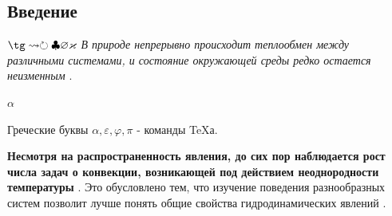 \documentclass[14pt,a4paper,oneside]{extarticle}	%
\begin{document}
\newpage 	%

\setcounter{page}{3}%
\renewcommand{\contentsname}{\center{Содержание}} 	%
\tableofcontents

\newpage

	\begin{center}
		\section*{Введение} %
	\end{center}
$\tg \rightsquigarrow \circlearrowright \clubsuit\varnothing\varkappa$
\textit{В природе непрерывно происходит теплообмен между различными
системами, и состояние окружающей среды редко остается неизменным} \cite{Afanasyev92}. %



	\begin{center}
\XeTeX{}
\end{center}


$\alpha$

Греческие буквы $ \alpha, \varepsilon, \varphi, \pi $ - команды \TeX{}а.

\textbf{Несмотря на распространенность явления, до сих пор наблюдается рост числа задач о конвекции, возникающей под действием неоднородности температуры} \cite{Ponomarenko86,rutherford}.
Это обусловлено тем, что изучение поведения разнообразных систем позволит лучше понять общие свойства гидродинамических явлений \cite{Belousova81,Belousova82,dixit}.
\end{document}
